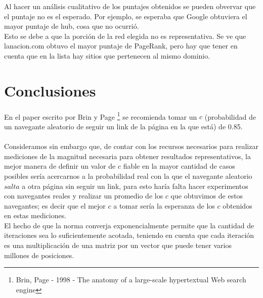 \documentclass[a4paper]{article}
\begin{document}
Al hacer un análisis cualitativo de los puntajes obtenidos se pueden obvervar que el puntaje no es el esperado. Por ejemplo, se esperaba que Google obtuviera el mayor puntaje de hub, cosa que no ocurrió.\\

Esto se debe a que la porción de la red elegida no es representativa. Se ve que lanacion.com obtuvo el mayor puntaje de PageRank, pero hay que tener en cuenta que en la lista hay sitios que pertenecen al mismo dominio.\\

\newpage

\section{Conclusiones}
\label{sec:conclusiones}


En el paper escrito por Brin y Page \footnote{Brin, Page - 1998 - The anatomy of a large-scale hypertextual Web search engine} se recomienda tomar un $c$ (probabilidad de un navegante aleatorio de seguir un link de la página en la que está) de 0.85.\\ \\%

Consideramos sin embargo que, de contar con los recursos necesarios para realizar mediciones de la magnitud necesaria para obtener resultados representativos, la mejor manera de definir un valor de $c$ fiable en la mayor cantidad de casos posibles sería acercarnos a la probabilidad real con la que el navegante aleatorio $salta$ a otra página sin seguir un link, para esto haría falta hacer experimentos con navegantes reales y realizar un promedio de los $c$ que obtuvimos de estos navegantes; es decir que el mejor $c$ a tomar sería la esperanza de los $c$ obtenidos en estas mediciones.\\

El hecho de que la norma converja exponencialmente permite que la cantidad de iteraciones sea lo suficientemente acotada, teniendo en cuenta que cada iteración es una multiplicación de una matriz por un vector que puede tener varios millones de posiciones.
\end{document}
